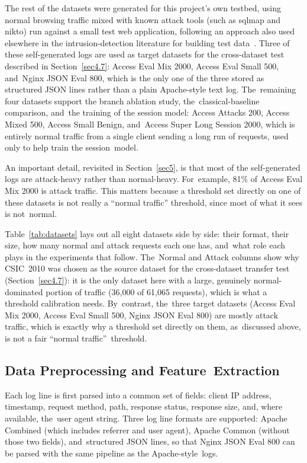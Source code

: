 \documentclass[futureinternet,article,accept,moreauthors]{Definitions/mdpi}
\begin{document}
The rest of the datasets were generated for this project's own testbed, using normal browsing traffic mixed with known attack tools (such as sqlmap and nikto) run against a small test web application, following an approach also used elsewhere in the intrusion-detection literature for building test data~\cite{shiravi2012}. Three of these self-generated logs are used as target datasets for the cross-dataset test described in Section~\ref{sec4.7}: Access Eval Mix 2000, Access Eval Small 500, and~Nginx JSON Eval 800, which is the only one of the three stored as structured JSON lines rather than a plain Apache-style text log. The~remaining four datasets support the branch ablation study, the~classical-baseline comparison, and~the training of the session model: Access Attacks 200, Access Mixed 500, Access Small Benign, and~Access Super Long Session 2000, which is entirely normal traffic from a single client sending a long run of requests, used only to help train the session~model.

An important detail, revisited in Section~\ref{sec5}, is that most of the self-generated logs are attack-heavy rather than normal-heavy. For~example, 81\% of Access Eval Mix 2000 is attack traffic. This matters because a threshold set directly on one of these datasets is not really a ``normal traffic'' threshold, since most of what it sees is not~normal.



Table~\ref{tab:datasets} lays out all eight datasets side by side: their format, their size, how many normal and attack requests each one has, and~what role each plays in the experiments that follow. The~Normal and Attack columns show why CSIC~2010 was chosen as the source dataset for the cross-dataset transfer test (Section~\ref{sec4.7}): it is the only dataset here with a large, genuinely normal-dominated portion of traffic (36{,}000 of 61{,}065 requests), which is what a threshold calibration needs. By~contrast, the~three target datasets (Access Eval Mix 2000, Access Eval Small 500, Nginx JSON Eval 800) are mostly attack traffic, which is exactly why a threshold set directly on them, as~discussed above, is not a fair ``normal traffic''~threshold.

\subsection{Data Preprocessing and Feature~Extraction} \label{sec4.3}

Each log line is first parsed into a common set of fields: client IP address, timestamp, request method, path, response status, response size, and, where available, the~user agent string. Three log line formats are supported: Apache Combined (which includes referrer and user agent), Apache Common (without those two fields), and~structured JSON lines, so that Nginx JSON Eval 800 can be parsed with the same pipeline as the Apache-style~logs.
\end{document}

